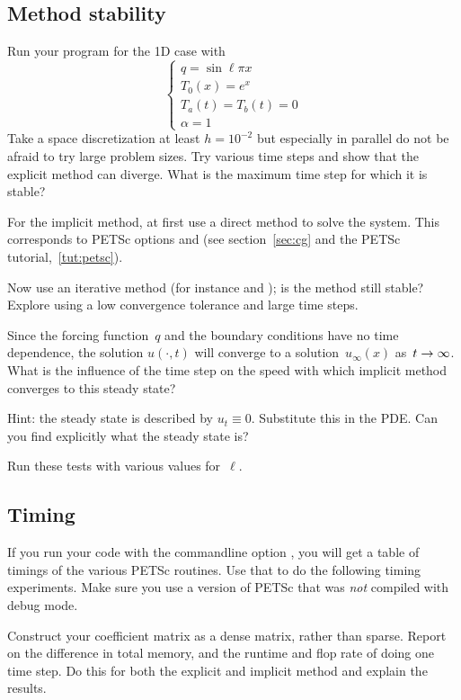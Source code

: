 \subsection*{Method stability}

Run your program for the 1D case with 
\[
\begin{cases}
  q=\sin\ell\pi x\\ T_0(x)=e^x\\ T_a(t)=T_b(t)=0\\ \alpha=1
\end{cases}
\]
Take a space discretization at least $h=10^{-2}$ but especially in
parallel do not be afraid to try large problem sizes. Try various 
time steps
and show that
the explicit method can diverge. What is the maximum time step for
which it is stable? 

For the implicit method, at first use a direct method to solve the
system.
This corresponds to PETSc options  and  (see
section~\ref{sec:cg} and the PETSc tutorial,~\ref{tut:petsc}).

Now use an iterative method (for instance  and );
is the method still stable? Explore using a low convergence tolerance
and large time steps. 

Since the forcing function~$q$ and the boundary conditions have no
time dependence, the solution $u(\cdot,t)$ will converge to a
 solution~$u_\infty(x)$
as~$t\rightarrow\nobreak\infty$. What is the influence of the time step on the
speed with which implicit method converges to this steady state?

Hint: the steady state is described by $u_t\equiv0$. Substitute this
in the \ac{PDE}. Can you find explicitly what the steady state is?

Run these tests with various values for~$\ell$.

\subsection*{Timing}

If you run your code with the commandline option , you
will get a table of timings of the various PETSc routines. Use that to do
the following timing experiments. Make sure you use a version of PETSc
that was \emph{not} compiled with debug mode.

Construct your coefficient matrix as a dense matrix, rather than
sparse. Report on the difference in total memory, and the runtime and
flop rate of doing one time step. Do this for both the explicit and
implicit method and explain the results.

